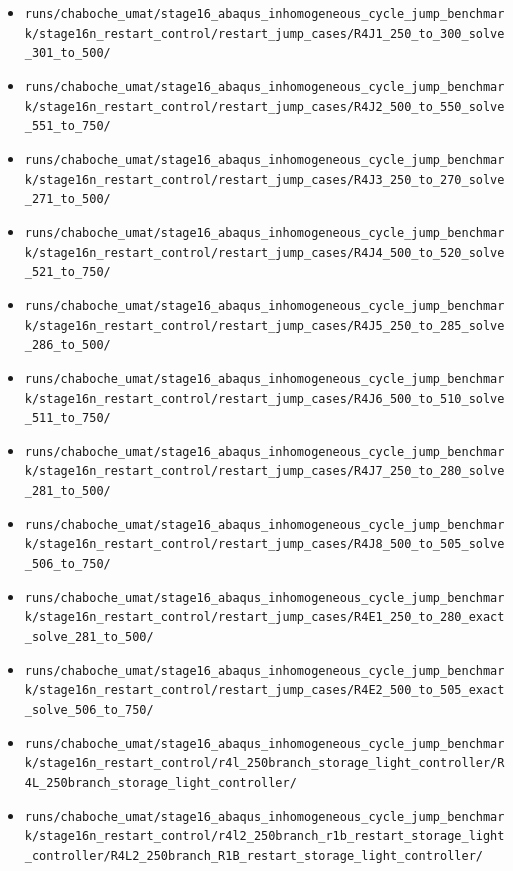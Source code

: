 \documentclass[11pt,a4paper]{article}
\newcommand{\code}[1]{\texttt{#1}}
\begin{document}
\begin{itemize}
  \item \code{runs/chaboche\_umat/stage16\_abaqus\_inhomogeneous\_cycle\_jump\_benchmark/stage16n\_restart\_control/restart\_jump\_cases/R4J1\_250\_to\_300\_solve\_301\_to\_500/}
  \item \code{runs/chaboche\_umat/stage16\_abaqus\_inhomogeneous\_cycle\_jump\_benchmark/stage16n\_restart\_control/restart\_jump\_cases/R4J2\_500\_to\_550\_solve\_551\_to\_750/}
  \item \code{runs/chaboche\_umat/stage16\_abaqus\_inhomogeneous\_cycle\_jump\_benchmark/stage16n\_restart\_control/restart\_jump\_cases/R4J3\_250\_to\_270\_solve\_271\_to\_500/}
  \item \code{runs/chaboche\_umat/stage16\_abaqus\_inhomogeneous\_cycle\_jump\_benchmark/stage16n\_restart\_control/restart\_jump\_cases/R4J4\_500\_to\_520\_solve\_521\_to\_750/}
  \item \code{runs/chaboche\_umat/stage16\_abaqus\_inhomogeneous\_cycle\_jump\_benchmark/stage16n\_restart\_control/restart\_jump\_cases/R4J5\_250\_to\_285\_solve\_286\_to\_500/}
  \item \code{runs/chaboche\_umat/stage16\_abaqus\_inhomogeneous\_cycle\_jump\_benchmark/stage16n\_restart\_control/restart\_jump\_cases/R4J6\_500\_to\_510\_solve\_511\_to\_750/}
  \item \code{runs/chaboche\_umat/stage16\_abaqus\_inhomogeneous\_cycle\_jump\_benchmark/stage16n\_restart\_control/restart\_jump\_cases/R4J7\_250\_to\_280\_solve\_281\_to\_500/}
  \item \code{runs/chaboche\_umat/stage16\_abaqus\_inhomogeneous\_cycle\_jump\_benchmark/stage16n\_restart\_control/restart\_jump\_cases/R4J8\_500\_to\_505\_solve\_506\_to\_750/}
  \item \code{runs/chaboche\_umat/stage16\_abaqus\_inhomogeneous\_cycle\_jump\_benchmark/stage16n\_restart\_control/restart\_jump\_cases/R4E1\_250\_to\_280\_exact\_solve\_281\_to\_500/}
  \item \code{runs/chaboche\_umat/stage16\_abaqus\_inhomogeneous\_cycle\_jump\_benchmark/stage16n\_restart\_control/restart\_jump\_cases/R4E2\_500\_to\_505\_exact\_solve\_506\_to\_750/}
  \item \code{runs/chaboche\_umat/stage16\_abaqus\_inhomogeneous\_cycle\_jump\_benchmark/stage16n\_restart\_control/r4l\_250branch\_storage\_light\_controller/R4L\_250branch\_storage\_light\_controller/}
  \item \code{runs/chaboche\_umat/stage16\_abaqus\_inhomogeneous\_cycle\_jump\_benchmark/stage16n\_restart\_control/r4l2\_250branch\_r1b\_restart\_storage\_light\_controller/R4L2\_250branch\_R1B\_restart\_storage\_light\_controller/}

\end{itemize}
\end{document}
